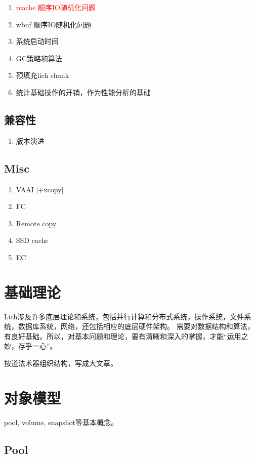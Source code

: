 \documentclass[UTF8]{ctexart}
\begin{document}
\begin{enumerate}
    \item \textcolor{red}{rcache 顺序IO随机化问题}
    \item wbuf 顺序IO随机化问题
    \item 系统启动时间
    \item GC策略和算法
    \item 预填充lich chunk
    \item 统计基础操作的开销，作为性能分析的基础
\end{enumerate}

\subsection{兼容性}

\begin{enumerate}
    \item 版本演进
\end{enumerate}

\subsection{Misc}

\begin{enumerate}
    \item VAAI [+xcopy]
    \item FC
    \item Remote copy
    \item SSD cache
    \item EC
\end{enumerate}


\section{基础理论}

Lich涉及许多底层理论和系统，包括并行计算和分布式系统，操作系统，文件系统，数据库系统，网络，还包括相应的底层硬件架构。
需要对数据结构和算法，有良好基础。所以，对基本问题和理论，要有清晰和深入的掌握，才能“运用之妙，存乎一心”。

按道法术器组织结构，写成大文章。

\section{对象模型}

pool, volume, snapshot等基本概念。

\subsection{Pool}
\end{document}

